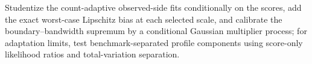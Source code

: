Studentize the count-adaptive observed-side fits conditionally on the scores, add the exact worst-case Lipschitz bias at each selected scale, and calibrate the boundary--bandwidth supremum by a conditional Gaussian multiplier process; for adaptation limits, test benchmark-separated profile components using score-only likelihood ratios and total-variation separation.